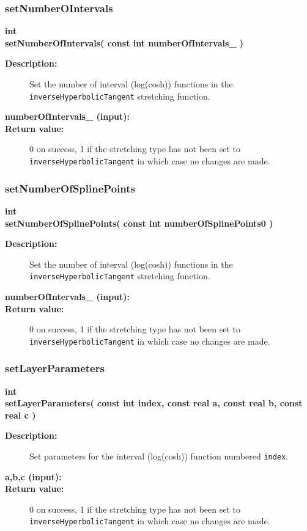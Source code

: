 \subsubsection{setNumberOIntervals}
 
\begin{flushleft} \textbf{%
int  \\ 
\settowidth{\StretchMappingIncludeArgIndent}{setNumberOfIntervals(}%
setNumberOfIntervals( const int numberOfIntervals\_ )
}\end{flushleft}
\begin{description}
\item[{\bf Description:}]  
    Set the number of interval (log(cosh)) functions in the {\tt inverseHyperbolicTangent} stretching
   function.
\item[{\bf numberOfIntervals\_ (input):}] 
\item[{\bf Return value:}]  0 on success, 1 if the stretching type has not been set to {\tt inverseHyperbolicTangent}
   in which case no changes are made.  
\end{description}
\subsubsection{setNumberOfSplinePoints}
 
\begin{flushleft} \textbf{%
int  \\ 
\settowidth{\StretchMappingIncludeArgIndent}{setNumberOfSplinePoints(}%
setNumberOfSplinePoints( const int numberOfSplinePoints0 )
}\end{flushleft}
\begin{description}
\item[{\bf Description:}]  
    Set the number of interval (log(cosh)) functions in the {\tt inverseHyperbolicTangent} stretching
   function.
\item[{\bf numberOfIntervals\_ (input):}] 
\item[{\bf Return value:}]  0 on success, 1 if the stretching type has not been set to {\tt inverseHyperbolicTangent}
   in which case no changes are made.  
\end{description}
\subsubsection{setLayerParameters}
 
\begin{flushleft} \textbf{%
int  \\ 
\settowidth{\StretchMappingIncludeArgIndent}{setLayerParameters(}%
setLayerParameters( const int index, const real a, const real b, const real c )
}\end{flushleft}
\begin{description}
\item[{\bf Description:}]  
    Set parameters for the interval (log(cosh)) function numbered {\tt index}.
\item[{\bf a,b,c (input):}] 
\item[{\bf Return value:}]  0 on success, 1 if the stretching type has not been set to {\tt inverseHyperbolicTangent}
   in which case no changes are made.  
\end{description}
